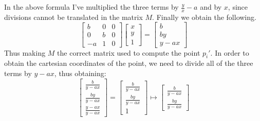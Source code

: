 \documentclass{article}
\begin{document}
In the above formula I've multiplied the three terms by $\frac{y}{x} - a$ and by $x$, since divisions cannot be translated in the matrix $M$. Finally we obtain the following.
\[ \begin{bmatrix} b & 0 & 0 \\ 0 & b & 0 \\ -a & 1 & 0 \end{bmatrix} \begin{bmatrix} x \\ y \\ 1 \end{bmatrix} = \begin{bmatrix} b \\  by \\ y-ax \end{bmatrix} \]
Thus making $M$ the correct matrix used to compute the point $p_i'$. In order to obtain the cartesian coordinates of the point, we need to divide all of the three terms by $y - ax$, thus obtaining:
\[ \begin{bmatrix} \frac{b}{y-ax} \\  \frac{by}{y-ax} \\ \frac{y-ax}{y-ax} \end{bmatrix} = \begin{bmatrix} \frac{b}{y-ax} \\ \frac{by}{y-ax} \\ 1 \end{bmatrix} \mapsto \begin{bmatrix} \frac{b}{y-ax} \\ \frac{by}{y-ax} \end{bmatrix} \]
\end{document}
